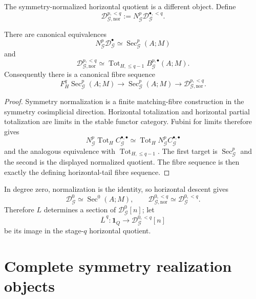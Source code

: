 The symmetry-normalized horizontal quotient is a different object.  Define
\[
\boxed{
\mathcal D_{\mathcal G,\mathrm{nor}}^{p,<q}
:=
N_{\mathcal G}^p
\mathcal D_{\mathcal G}^{\bullet,<q}.
}
\]

\begin{lemma}
\label{lem:symmetry-noether-symmetry-normalization-commutes-with-horizontal-quotient}
There are canonical equivalences
\[
N_{\mathcal G}^p\mathcal D_{\mathcal G}^{\bullet}
\simeq
\operatorname{Sec}_{\mathcal G}^{p}(A;M)
\]
and
\[
\boxed{
\mathcal D_{\mathcal G,\mathrm{nor}}^{p,<q}
\simeq
\operatorname{Tot}_{H,\le q-1}
B_{\mathcal G}^{p,\bullet}(A;M).
}
\]
Consequently there is a canonical fibre sequence
\[
\boxed{
F_H^q\operatorname{Sec}_{\mathcal G}^{p}(A;M)
\longrightarrow
\operatorname{Sec}_{\mathcal G}^{p}(A;M)
\longrightarrow
\mathcal D_{\mathcal G,\mathrm{nor}}^{p,<q}.
}
\]
\end{lemma}

\begin{proof}
Symmetry normalization is a finite matching-fibre construction in the symmetry
cosimplicial direction.  Horizontal totalization and horizontal partial
totalization are limits in the stable functor category.  Fubini for limits
therefore gives
\[
N_{\mathcal G}^p\operatorname{Tot}_H C_{\mathcal G}^{\bullet,\bullet}
\simeq
\operatorname{Tot}_H N_{\mathcal G}^pC_{\mathcal G}^{\bullet,\bullet}
\]
and the analogous equivalence with $\operatorname{Tot}_{H,\le q-1}$.
The first target is $\operatorname{Sec}_{\mathcal G}^p$ and the second is the
displayed normalized quotient.  The fibre sequence is then exactly the defining
horizontal-tail fibre sequence.
\end{proof}

In degree zero, normalization is the identity, so horizontal descent gives
\[
\mathcal D_{\mathcal G}^{0}
\simeq
\operatorname{Sec}^0(A;M),
\qquad
\mathcal D_{\mathcal G,\mathrm{nor}}^{0,<q}
\simeq
\mathcal D_{\mathcal G}^{0,<q}.
\]
Therefore $L$ determines a section of $\mathcal D_{\mathcal G}^{0}[n]$; let
\[
\overline L^{\,q}
:
\mathbf1_Q
\longrightarrow
\mathcal D_{\mathcal G}^{0,<q}[n]
\]
be its image in the stage-$q$ horizontal quotient.

\section{Complete symmetry realization objects}
\label{sec:symmetry-noether-complete-symmetry-realization-objects}

